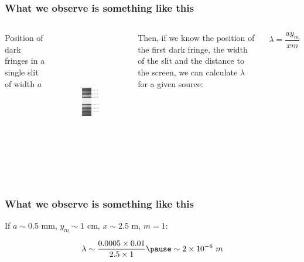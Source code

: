 \documentclass[]{beamer}
\begin{document}




 \begin{frame}
    \frametitle{What we observe is something like this}
  


\begin{columns}[c]
\column{2in}  %

\textcolor{mypink1}{Position of dark fringes in a single slit of width $a$}
\begin{figure}[h!]
  \begin{center}
    \includegraphics[height=2.5in]{images/4.jpg}
  \end{center}
\end{figure}


\column{2in}

\pause

Then, if we know  the position of the first dark fringe, the width of the slit and the 
distance to the screen, we can calculate $\lambda$ for a given source:
\vspace{5mm}

\pause
\begin{equation*}
    \lambda =\frac{ay_m}{xm}
\end{equation*}




\end{columns}



  \end{frame}
    
   \begin{frame}
    \frametitle{What we observe is something like this}
  
If $a\sim 0.5$ mm, $y_m \sim 1$ cm, $x\sim 2.5$ m, $m=1$:\pause
\vspace{7mm}

\begin{equation*}
    \lambda \sim\frac{0.0005\times0.01}{2.5\times 1}\pause\sim 2\times 10^{-6}~m
\end{equation*}


  \end{frame}
    


 
\end{document}
